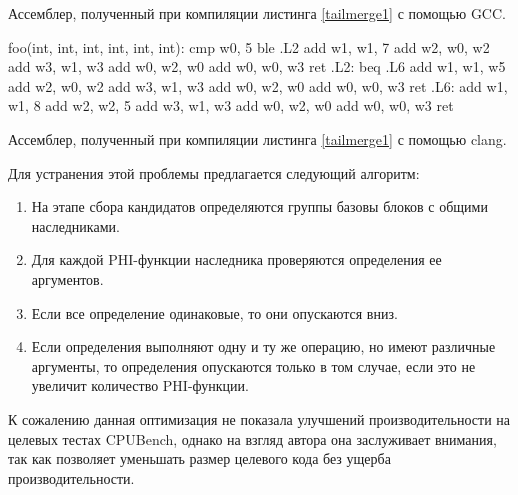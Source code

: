 \begin{ListingEnv}[!h]
	\captiondelim{ } %
	\caption{Ассемблер, полученный при компиляции листинга \ref{tailmerge1}  с помощью GCC.}\label{tailmerge2}
	\begin{Verb}
			foo(int, int, int, int, int, int):
			cmp     w0, 5
			ble     .L2
			add     w1, w1, 7
			add     w2, w0, w2
			add     w3, w1, w3
			add     w0, w2, w0
			add     w0, w0, w3
			ret
			.L2:
			beq     .L6
			add     w1, w1, w5
			add     w2, w0, w2
			add     w3, w1, w3
			add     w0, w2, w0
			add     w0, w0, w3
			ret
			.L6:
			add     w1, w1, 8
			add     w2, w2, 5
			add     w3, w1, w3
			add     w0, w2, w0
			add     w0, w0, w3
			ret

	\end{Verb}
\end{ListingEnv}
\begin{ListingEnv}[!h]
	\captiondelim{ } %
	\caption{Ассемблер, полученный при компиляции листинга \ref{tailmerge1}  с помощью clang.}\label{tailmerge3}
\end{ListingEnv}


Для устранения этой проблемы предлагается следующий алгоритм:

\begin{enumerate}
	\item На этапе сбора кандидатов определяются группы базовы блоков с общими наследниками.
	\item Для каждой PHI-функции наследника проверяются определения ее аргументов.
	\item Если все определение одинаковые, то они опускаются вниз.
	\item Если определения выполняют одну и ту же операцию, но имеют различные аргументы, то определения опускаются только в том случае, если это не увеличит количество PHI-функции.
\end{enumerate}

К сожалению данная оптимизация не показала улучшений производительности на целевых тестах CPUBench, однако на взгляд автора она заслуживает внимания, так как позволяет уменьшать размер целевого кода без ущерба производительности.
